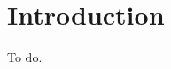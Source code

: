 \documentclass[../masters.tex]{subfiles}
\begin{document}
\graphicspath{{./imgs/}{../imgs/}} %

\section{Introduction}
To do.

%
%
\end{document}
